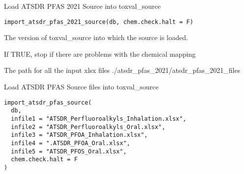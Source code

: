 \documentclass[letterpaper]{book}
\begin{document}
%
\begin{Description}\relax
Load ATSDR PFAS 2021 Source into toxval\_source
\end{Description}
%
\begin{Usage}
\begin{verbatim}
import_atsdr_pfas_2021_source(db, chem.check.halt = F)
\end{verbatim}
\end{Usage}
%
\begin{Arguments}
\begin{ldescription}
\item[\code{db}] The version of toxval\_source into which the source is loaded.

\item[\code{chem.check.halt}] If TRUE, stop if there are problems with the chemical mapping

\item[\code{indir}] The path for all the input xlsx files ./atsdr\_pfas\_2021/atsdr\_pfas\_2021\_files
\end{ldescription}
\end{Arguments}
%
\begin{Description}\relax
Load ATSDR PFAS Source files into toxval\_source
\end{Description}
%
\begin{Usage}
\begin{verbatim}
import_atsdr_pfas_source(
  db,
  infile1 = "ATSDR_Perfluoroalkyls_Inhalation.xlsx",
  infile2 = "ATSDR_Perfluoroalkyls_Oral.xlsx",
  infile3 = "ATSDR_PFOA_Inhalation.xlsx",
  infile4 = ".ATSDR_PFOA_Oral.xlsx",
  infile5 = "ATSDR_PFOS_Oral.xlsx",
  chem.check.halt = F
)
\end{verbatim}
\end{Usage}
%
\end{document}
